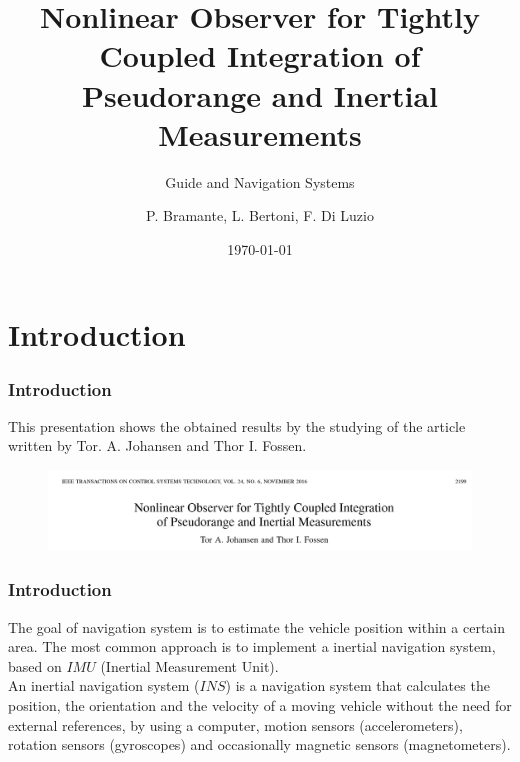 \documentclass{beamer}
\title{Nonlinear Observer for Tightly Coupled Integration of Pseudorange and Inertial Measurements}
\subtitle{Guide and Navigation Systems}
\author{P. Bramante, L. Bertoni, F. Di Luzio}
\institute{Universit\`a degli Studi di Pisa \\ Master's Degree in Robotics and Automation Engineering}
\date{\today}
\begin{document}
	
	\begin{frame}
	\titlepage
	\end{frame}	



\section{Introduction}
	\begin{frame}
		\frametitle{Introduction}
		This presentation shows the obtained results by the studying of the article written by Tor. A. Johansen and Thor I. Fossen.
		\vspace{0.5cm}
		
	\begin{figure}[H]
			\centering
			\includegraphics[scale=0.3]{title}
		\end{figure}
	\end{frame}

	\begin{frame}
		\frametitle{Introduction}
	The goal of navigation system is to estimate the vehicle position within a certain area. The most common approach is to implement a inertial navigation system, based on $IMU$ (Inertial Measurement Unit).\\
	\vspace{0.3cm}
	An inertial navigation system ($INS$) is a navigation system that calculates the position, the orientation and the velocity of a moving vehicle without the need for external references, by using a computer, motion sensors (accelerometers), rotation sensors (gyroscopes) and occasionally magnetic sensors (magnetometers).
	
	
	\end{frame}
\end{document}
